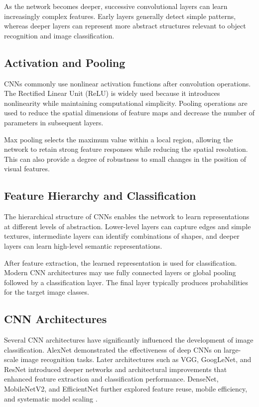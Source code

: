 \documentclass[conference]{IEEEtran}
\begin{document}
As the network becomes deeper, successive convolutional layers can learn increasingly complex features. Early layers generally detect simple patterns, whereas deeper layers can represent more abstract structures relevant to object recognition and image classification.

\subsection{Activation and Pooling}

CNNs commonly use nonlinear activation functions after convolution operations. The Rectified Linear Unit (ReLU) is widely used because it introduces nonlinearity while maintaining computational simplicity. Pooling operations are used to reduce the spatial dimensions of feature maps and decrease the number of parameters in subsequent layers.

Max pooling selects the maximum value within a local region, allowing the network to retain strong feature responses while reducing the spatial resolution. This can also provide a degree of robustness to small changes in the position of visual features.

\subsection{Feature Hierarchy and Classification}

The hierarchical structure of CNNs enables the network to learn representations at different levels of abstraction. Lower-level layers can capture edges and simple textures, intermediate layers can identify combinations of shapes, and deeper layers can learn high-level semantic representations.

After feature extraction, the learned representation is used for classification. Modern CNN architectures may use fully connected layers or global pooling followed by a classification layer. The final layer typically produces probabilities for the target image classes.

\subsection{CNN Architectures}

Several CNN architectures have significantly influenced the development of image classification. AlexNet demonstrated the effectiveness of deep CNNs on large-scale image recognition tasks. Later architectures such as VGG, GoogLeNet, and ResNet introduced deeper networks and architectural improvements that enhanced feature extraction and classification performance. DenseNet, MobileNetV2, and EfficientNet further explored feature reuse, mobile efficiency, and systematic model scaling \cite{krizhevsky2012,simonyan2015,szegedy2015,he2016,huang2017,sandler2018,tan2019}.
\end{document}
